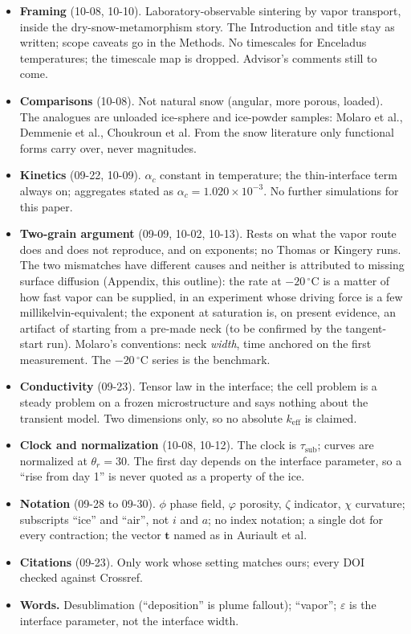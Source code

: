 \documentclass[11pt]{article}
\begin{document}
\begin{itemize}
\item \textbf{Framing} (10-08, 10-10). Laboratory-observable sintering by
  vapor transport, inside the dry-snow-metamorphism story. The Introduction
  and title stay as written; scope caveats go in the Methods. No timescales
  for Enceladus temperatures; the timescale map is dropped. Advisor's
  comments still to come.
\item \textbf{Comparisons} (10-08). Not natural snow (angular, more porous,
  loaded). The analogues are unloaded ice-sphere and ice-powder samples:
  Molaro et al., Demmenie et al., Choukroun et al. From the snow literature
  only functional forms carry over, never magnitudes.
\item \textbf{Kinetics} (09-22, 10-09). $\alpha_c$ constant in temperature;
  the thin-interface term always on; aggregates stated as $\alpha_c = 1.020
  \times 10^{-3}$. No further simulations for this paper.
\item \textbf{Two-grain argument} (09-09, 10-02, 10-13). Rests on what the
  vapor route does and does not reproduce, and on exponents; no Thomas or
  Kingery runs. The two mismatches have different causes and neither is
  attributed to missing surface diffusion (Appendix, this outline): the rate
  at $-20\,^{\circ}$C is a matter of how fast vapor can be supplied, in an
  experiment whose driving force is a few millikelvin-equivalent; the
  exponent at saturation is, on present evidence, an artifact of starting
  from a pre-made neck (to be confirmed by the tangent-start run). Molaro's conventions: neck \emph{width}, time anchored on the first
  measurement. The $-20\,^{\circ}$C series is the benchmark.
\item \textbf{Conductivity} (09-23). Tensor law in the interface; the cell
  problem is a steady problem on a frozen microstructure and says nothing
  about the transient model. Two dimensions only, so no absolute
  $k_{\mathrm{eff}}$ is claimed.
\item \textbf{Clock and normalization} (10-08, 10-12). The clock is
  $\tau_{\mathrm{sub}}$; curves are normalized at $\theta_r = 30$. The first day depends on the interface parameter, so a
  ``rise from day 1'' is never quoted as a property of the ice.
\item \textbf{Notation} (09-28 to 09-30). $\phi$ phase field, $\varphi$
  porosity, $\zeta$ indicator, $\chi$ curvature; subscripts ``ice'' and
  ``air'', not $i$ and $a$; no index notation; a single dot for every
  contraction; the vector $\mathbf{t}$ named as in Auriault et al.
\item \textbf{Citations} (09-23). Only work whose setting matches ours;
  every DOI checked against Crossref.
\item \textbf{Words.} Desublimation (``deposition'' is plume fallout);
  ``vapor''; $\varepsilon$ is the interface parameter, not the interface
  width.
\end{itemize}
\end{document}
